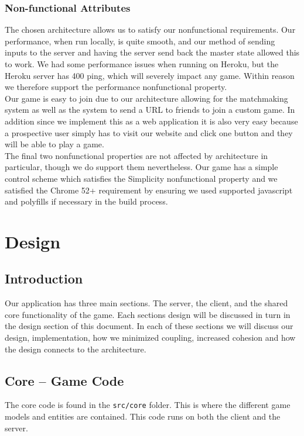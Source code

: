 \documentclass[12pt]{report}
\begin{document}
\subsection{Non-functional Attributes}
The chosen architecture allows us to satisfy our nonfunctional requirements. Our performance, when run locally, is quite smooth, and our method of sending inputs to the server and having the server send back the master state allowed this to work. We had some performance issues when running on Heroku, but the Heroku server has 400 ping, which will severely impact any game. Within reason we therefore support the performance nonfunctional property. \\
Our game is easy to join due to our architecture allowing for the matchmaking system as well as the system to send a URL to friends to join a custom game. In addition since we implement this as a web application it is also very easy because a prospective user simply has to visit our website and click one button and they will be able to play a game. \\
The final two nonfunctional properties are not affected by architecture in particular, though we do support them nevertheless. Our game has a simple control scheme which satisfies the Simplicity nonfunctional property and we satisfied the Chrome 52+ requirement by ensuring we used supported javascript and polyfills if necessary in the build process.


\chapter{Design}

\section{Introduction}
Our application has three main sections. The server, the client, and the shared core functionality of the game. Each sections design will be discussed in turn in the design section of this document. In each of these sections we will discuss our design, implementation, how we minimized coupling, increased cohesion and how the design connects to the architecture. 
\section{Core -- Game Code}

The core code is found in the \texttt{src/core} folder. This is where the different game models and entities are contained. This code runs on both the client and the server. 
\end{document}
